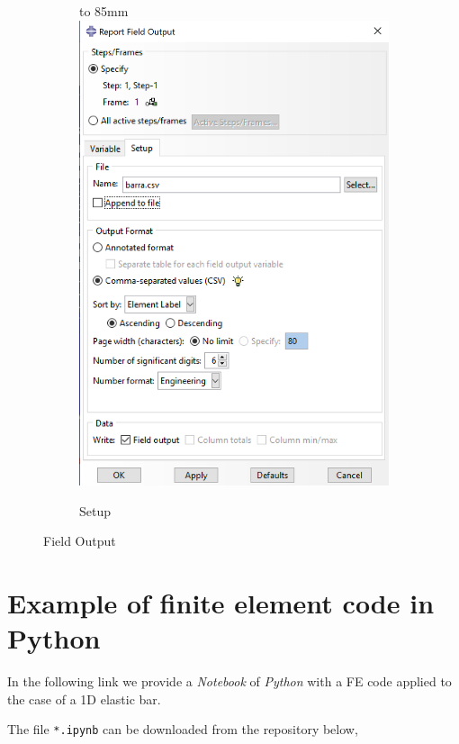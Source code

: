 \documentclass[spanish,a4paper,12pt]{article}
\def\imagebox#1#2{\vtop to #1{\null\hbox{#2}\vfill}}
\begin{document}
\begin{figure}
\begin{subfigure}[b]{0.36\textwidth}
    \imagebox{85mm}{\includegraphics[scale=0.35]{capturas/out2.png}}
    \caption{Setup\label{fig:out1b}}
  \end{subfigure}
\caption{Field Output}
\label{fig:out1}
\end{figure}

\clearpage
\section{Example of finite element code in Python}
\label{sec:python}

In the following link we provide a \emph{Notebook} of \emph{Python} with a FE code applied to the case of a 1D elastic bar.

The file \texttt{*.ipynb} can be downloaded from the repository below,\\
\end{document}
